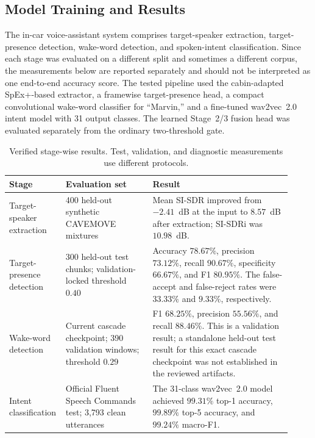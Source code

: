 
\subsection{Model Training and Results}

The in-car voice-assistant system comprises target-speaker extraction, target-presence detection, wake-word detection, and spoken-intent classification. Since each stage was evaluated on a different split and sometimes a different corpus, the measurements below are reported separately and should not be interpreted as one end-to-end accuracy score. The tested pipeline used the cabin-adapted SpEx+-based extractor, a framewise target-presence head, a compact convolutional wake-word classifier for ``Marvin,'' and a fine-tuned wav2vec~2.0 intent model with 31 output classes. The learned Stage~2/3 fusion head was evaluated separately from the ordinary two-threshold gate.

\begin{table}[t]
\centering
\small
\caption{Verified stage-wise results. Test, validation, and diagnostic measurements use different protocols.}
\label{tab:stagewise-results-updated}
\begin{tabular}{p{0.14\linewidth}p{0.30\linewidth}p{0.48\linewidth}}
\hline
Stage & Evaluation set & Result \\
\hline
Target-speaker extraction & 400 held-out synthetic CAVEMOVE mixtures & Mean SI-SDR improved from $-2.41$~dB at the input to $8.57$~dB after extraction; SI-SDRi was $10.98$~dB. \\
Target-presence detection & 300 held-out test chunks; validation-locked threshold $0.40$ & Accuracy $78.67\%$, precision $73.12\%$, recall $90.67\%$, specificity $66.67\%$, and F1 $80.95\%$. The false-accept and false-reject rates were $33.33\%$ and $9.33\%$, respectively. \\
Wake-word detection & Current cascade checkpoint; 390 validation windows; threshold $0.29$ & F1 $68.25\%$, precision $55.56\%$, and recall $88.46\%$. This is a validation result; a standalone held-out test result for this exact cascade checkpoint was not established in the reviewed artifacts. \\
Intent classification & Official Fluent Speech Commands test; 3,793 clean utterances & The 31-class wav2vec~2.0 model achieved $99.31\%$ top-1 accuracy, $99.89\%$ top-5 accuracy, and $99.24\%$ macro-F1. \\
\hline
\end{tabular}
\end{table}

